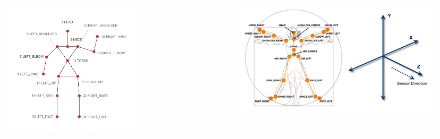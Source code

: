 \documentclass[8pt,sans,mathserif]{beamer}%
\begin{document}
\begin{frame}
    \begin{columns}
        \begin{figure}[t]
            \includegraphics[width=1.0\linewidth, keepaspectratio]{fig/openni-skeleton.png}
        \end{figure}
        \begin{figure}[t]
            \includegraphics[width=1.0\linewidth, keepaspectratio]{fig/kinect-joints.png}
        \end{figure}
    \end{columns}

\end{frame}
\end{document}
